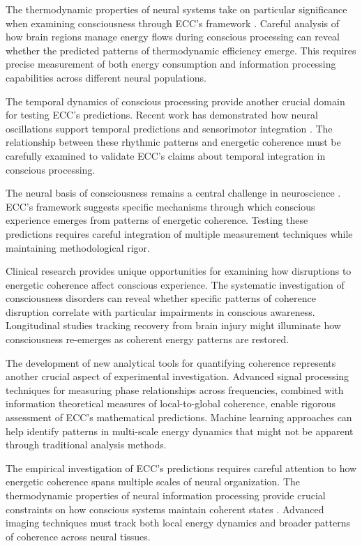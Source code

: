 \begin{refsection}
The thermodynamic properties of neural systems take on particular significance when examining consciousness through ECC's framework \cite{Sherrington2018}. Careful analysis of how brain regions manage energy flows during conscious processing can reveal whether the predicted patterns of thermodynamic efficiency emerge. This requires precise measurement of both energy consumption and information processing capabilities across different neural populations.

The temporal dynamics of conscious processing provide another crucial domain for testing ECC's predictions. Recent work has demonstrated how neural oscillations support temporal predictions and sensorimotor integration \cite{Palva2018}. The relationship between these rhythmic patterns and energetic coherence must be carefully examined to validate ECC's claims about temporal integration in conscious processing.

The neural basis of consciousness remains a central challenge in neuroscience \cite{Kucyi2017}. ECC's framework suggests specific mechanisms through which conscious experience emerges from patterns of energetic coherence. Testing these predictions requires careful integration of multiple measurement techniques while maintaining methodological rigor.

Clinical research provides unique opportunities for examining how disruptions to energetic coherence affect conscious experience. The systematic investigation of consciousness disorders can reveal whether specific patterns of coherence disruption correlate with particular impairments in conscious awareness. Longitudinal studies tracking recovery from brain injury might illuminate how consciousness re-emerges as coherent energy patterns are restored.

The development of new analytical tools for quantifying coherence represents another crucial aspect of experimental investigation. Advanced signal processing techniques for measuring phase relationships across frequencies, combined with information theoretical measures of local-to-global coherence, enable rigorous assessment of ECC's mathematical predictions. Machine learning approaches can help identify patterns in multi-scale energy dynamics that might not be apparent through traditional analysis methods.

The empirical investigation of ECC's predictions requires careful attention to how energetic coherence spans multiple scales of neural organization. The thermodynamic properties of neural information processing provide crucial constraints on how conscious systems maintain coherent states \cite{Sherrington2018}. Advanced imaging techniques must track both local energy dynamics and broader patterns of coherence across neural tissues.


\end{refsection}
